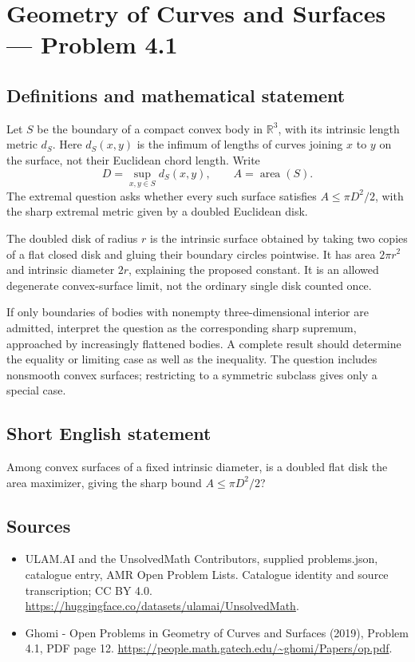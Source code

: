 \documentclass[11pt,a4paper]{article}
\begin{document}
\section*{Geometry of Curves and Surfaces — Problem 4.1}\label{statement}

\subsection{Definitions and mathematical statement}
Let $S$ be the boundary of a compact convex body in $\mathbb R^3$,
with its intrinsic length metric $d_S$. Here $d_S(x,y)$ is the
infimum of lengths of curves joining $x$ to $y$ on the surface,
not their Euclidean chord length. Write
\[
        D=\sup_{x,y\in S}d_S(x,y),\qquad A=\operatorname{area}(S).
\]
The extremal question asks whether every such surface satisfies
$A\le\pi D^2/2$, with the sharp extremal metric given by a
doubled Euclidean disk.

The doubled disk of radius $r$ is the intrinsic surface obtained
by taking two copies of a flat closed disk and gluing their
boundary circles pointwise. It has area $2\pi r^2$ and intrinsic
diameter $2r$, explaining the proposed constant. It is an
allowed degenerate convex-surface limit, not the ordinary
single disk counted once.

If only boundaries of bodies with nonempty three-dimensional
interior are admitted, interpret the question as the corresponding
sharp supremum, approached by increasingly flattened bodies.
A complete result should determine the equality or limiting
case as well as the inequality. The question includes nonsmooth
convex surfaces; restricting to a symmetric subclass gives only
a special case.
\subsection{Short English statement}
Among convex surfaces of a fixed intrinsic diameter, is a doubled
flat disk the area maximizer, giving the sharp bound
$A\le\pi D^2/2$?
\subsection{Sources}
\begin{itemize}
\item[S1] ULAM.AI and the UnsolvedMath Contributors, supplied problems.json, catalogue entry, AMR Open Problem Lists. Catalogue identity and source transcription; CC BY 4.0.
\url{https://huggingface.co/datasets/ulamai/UnsolvedMath}.
\item[S2] Ghomi - Open Problems in Geometry of Curves and Surfaces (2019), Problem 4.1, PDF page 12. 
\url{https://people.math.gatech.edu/~ghomi/Papers/op.pdf}.
\end{itemize}
\end{document}
